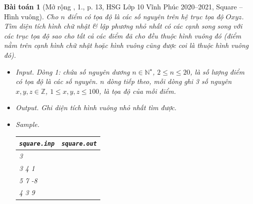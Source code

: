 \documentclass{article}
\newtheorem{baitoan}{Bài toán}
\begin{document}
\begin{baitoan}[Mở rộng \cite{Trung_HSG_THPT_Tin}, 1., p. 13, HSG Lớp 10 Vĩnh Phúc 2020--2021, Square -- Hình vuông]
	Cho $n$ điểm có tọa độ là các số nguyên trên hệ trục tọa độ $Oxyz$. Tìm diện tích hình chữ nhật \& lập phương nhỏ nhất có các cạnh song song với các trục tọa độ sao cho tất cả các điểm đã cho đều thuộc hình vuông đó (điểm nằm trên cạnh hình chữ nhật hoặc hình vuông cũng được coi là thuộc hình vuông đó).
	\begin{itemize}
		\item {\sf Input.} Dòng 1: chứa số nguyên dương $n\in\mathbb{N}^\star$, $2\le n\le20$, là số lượng điểm có tọa độ là các số nguyên. $n$ dòng tiếp theo, mỗi dòng ghi 3 số nguyên $x,y,z\in\mathbb{Z}$, $1\le x,y,z\le100$, là tọa độ của mỗi điểm.
		\item {\sf Output.} Ghi diện tích hình vuông nhỏ nhất tìm được.
		\item {\sf Sample.}
		\begin{table}[H]
			\centering
			\begin{tabular}{|l|l|}
				\hline
				\texttt{square.inp} & \texttt{square.out} \\
				\hline
				3 &  \\
				3 4 1 &  \\
				5 7 -8 &  \\
				4 3 9 &  \\
				\hline
			\end{tabular}
		\end{table}
	\end{itemize}
\end{baitoan}
\end{document}
